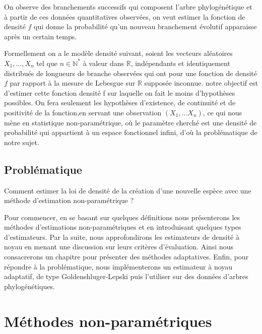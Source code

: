 \documentclass[
]{book}
\theoremstyle{definition}
\theoremstyle{definition}
\theoremstyle{definition}
\theoremstyle{definition}
\theoremstyle{remark}
\begin{document}
\hspace*{0.5cm}

On observe des branchements successifs qui composent l'arbre
phylogénétique et à partir de ces données quantitatives observées, on
veut estimer la fonction de densité \(f\) qui donne la probabilité
qu'un nouveau branchement évolutif apparaisse après un certain temps.

Formellement on a le modèle densité suivant, soient les vecteurs aléatoires \(X_1,\dots,X_n\) tel que \(n \in \mathbb{N^*}\) à valeur dans \(\mathbb{R}\), indépendants et identiquement distribués de longueurs de branche observées qui ont pour
une fonction de densité \(f\) par rapport à la mesure de Lebesgue sur \(\mathbb{R}\) supposée inconnue. notre objectif est d'estimer cette fonction densité f sur laquelle on fait le moins d'hypothèses possibles. On fera seulement les hypothèses d'existence, de continuité et de positivité de la fonction,en servant une observation \((X_1,...X_n)\), ce qui nous mène en statistique non-paramétrique, où le paramètre cherché est une densité de probabilité qui appartient à un espace fonctionnel infini, d'où la problématique de notre sujet.

\hypertarget{probluxe9matique}{%
\section{Problématique}\label{probluxe9matique}}

Comment estimer la loi de densité de la création d'une nouvelle espèce
avec une méthode d'estimation non-paramétrique ?

Pour commencer, en se basant sur quelques définitions nous présenterons les méthodes d'estimations non-paramétriques et en introduisant quelques types d'estimateurs.\newline
Par la suite, nous approfondirons les estimateurs de densité à noyau en menant une discussion sur leurs critères d'évaluation. Ainsi nous consacrerons un chapitre pour présenter des méthodes adaptatives.\newline
Enfin, pour répondre à la problématique, nous implémenterons un estimateur à noyau adaptatif, de type Goldenshluger-Lepski puis l'utiliser sur des données d'arbres phylogénétiques.

\hypertarget{muxe9thodes-non-paramuxe9triques}{%
\chapter{Méthodes non-paramétriques}\label{muxe9thodes-non-paramuxe9triques}}
\end{document}
